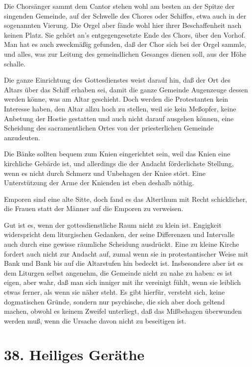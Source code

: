 Die Chorsänger sammt dem Cantor stehen wohl am besten an der Spitze der singenden Gemeinde, auf der Schwelle des Chores oder Schiffes, etwa auch in der sogenannten Vierung. Die Orgel aber fände wohl hier ihrer Beschaffenheit nach keinen Platz. Sie gehört an's entgegengesetzte Ende des Chors, über den Vorhof. Man hat es auch zweckmäßig gefunden, daß der Chor sich bei der Orgel sammle, und alles, was zur Leitung des gemeindlichen Gesanges dienen soll, aus der Höhe schalle.

Die ganze Einrichtung des Gottesdienstes weist darauf hin, daß der Ort des Altars über das Schiff erhaben sei, damit die ganze Gemeinde Augenzeuge dessen werden könne, was am Altar geschieht. Doch werden die Protestanten kein Interesse haben, den Altar allzu hoch zu stellen, weil sie kein Meßopfer, keine Anbetung der Hostie gestatten und auch nicht darauf ausgehen können, eine Scheidung des sacramentlichen Ortes von der priesterlichen Gemeinde anzudeuten.

Die Bänke sollten bequem zum Knien eingerichtet sein, weil das Knien eine kirchliche Gebärde ist, und allerdings die der Andacht förderlichste Stellung, wenn es nicht durch Schmerz und Unbehagen der Kniee stört. Eine Unterstützung der Arme der Knienden ist eben deshalb nöthig.

Emporen sind eine alte Sitte, doch fand es das Alterthum mit Recht schicklicher, die Frauen statt der Männer auf die Emporen zu verweisen.

Gut ist es, wenn der gottesdienstliche Raum nicht zu klein ist. Engigkeit widerspricht dem liturgischen Gedanken, der seine Differenzen und Intervalle auch durch eine gewisse räumliche Scheidung ausdrückt. Eine zu kleine Kirche fordert auch nicht zur Andacht auf, zumal wenn sie in protestantischer Weise mit Bank und Bank bis auf die Altarstufen hin bedeckt ist. Insbesondere aber ist es dem Liturgen selbst angenehm, die Gemeinde nicht zu nahe zu haben: es ist eigen, aber wahr, daß man sich inniger mit ihr vereinigt fühlt, wenn sie leiblich etwas ferner, als wenn sie näher steht. Es gibt hierfür, versteht sich, keine dogmatischen Gründe, sondern nur psychische, die sich aber doch geltend machen, obwohl es keinem Zweifel unterliegt, daß das Mißbehagen überwunden werden muß, wenn die Ursache davon nicht zu beseitigen ist.

\section{38. Heiliges Geräthe}

